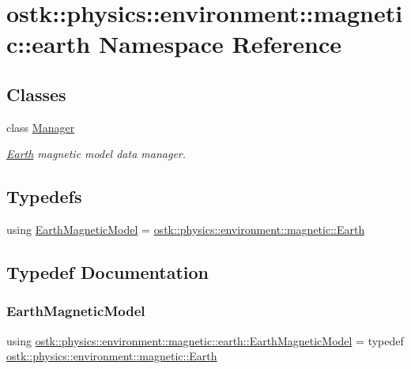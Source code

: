 \hypertarget{namespaceostk_1_1physics_1_1environment_1_1magnetic_1_1earth}{}\section{ostk\+:\+:physics\+:\+:environment\+:\+:magnetic\+:\+:earth Namespace Reference}
\label{namespaceostk_1_1physics_1_1environment_1_1magnetic_1_1earth}
\subsection*{Classes}
\begin{DoxyCompactItemize}
\item 
class \hyperlink{classostk_1_1physics_1_1environment_1_1magnetic_1_1earth_1_1_manager}{Manager}
\begin{DoxyCompactList}\small\item\em \hyperlink{classostk_1_1physics_1_1environment_1_1magnetic_1_1_earth}{Earth} magnetic model data manager. \end{DoxyCompactList}\end{DoxyCompactItemize}
\subsection*{Typedefs}
\begin{DoxyCompactItemize}
\item 
using \hyperlink{namespaceostk_1_1physics_1_1environment_1_1magnetic_1_1earth_aa5edfbbbb546cd7f4fb0e546d98c6e68}{Earth\+Magnetic\+Model} = \hyperlink{classostk_1_1physics_1_1environment_1_1magnetic_1_1_earth}{ostk\+::physics\+::environment\+::magnetic\+::\+Earth}
\end{DoxyCompactItemize}


\subsection{Typedef Documentation}
\mbox{\label{namespaceostk_1_1physics_1_1environment_1_1magnetic_1_1earth_aa5edfbbbb546cd7f4fb0e546d98c6e68}} 
\subsubsection{\texorpdfstring{Earth\+Magnetic\+Model}{EarthMagneticModel}}
{\footnotesize\ttfamily using \hyperlink{namespaceostk_1_1physics_1_1environment_1_1magnetic_1_1earth_aa5edfbbbb546cd7f4fb0e546d98c6e68}{ostk\+::physics\+::environment\+::magnetic\+::earth\+::\+Earth\+Magnetic\+Model} = typedef \hyperlink{classostk_1_1physics_1_1environment_1_1magnetic_1_1_earth}{ostk\+::physics\+::environment\+::magnetic\+::\+Earth}}

